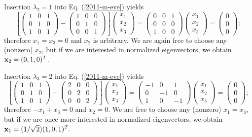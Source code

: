{Insertion  $\lambda_2=1$ into Eq. (\ref{2011-m-eve}) yields
\begin{equation}
\left[
\begin{pmatrix}
1&0&1\\
0&1&0\\
1&0&1
\end{pmatrix}  -
\begin{pmatrix}
1&0&0\\
0&1&0\\
0&0&1
\end{pmatrix}
\right]
\begin{pmatrix}
x_1\\
x_2\\
x_3
\end{pmatrix}
=
\begin{pmatrix}
0&0&1\\
0&0&0\\
1&0&0
\end{pmatrix}
\begin{pmatrix}
x_1\\
x_2\\
x_3
\end{pmatrix}
=
\begin{pmatrix}
0\\
0\\
0
\end{pmatrix}
;
\end{equation}
therefore $x_1=x_3=0$ and $x_2$ is arbitrary.
We are again free to choose any (nonzero) $x_2$,
but if we are interested in normalized eigenvectors, we obtain
${\bf x}_2 = (0,1,0)^T$.


Insertion  $\lambda_3=2$ into Eq. (\ref{2011-m-eve}) yields
\begin{equation}
\left[
\begin{pmatrix}
1&0&1\\
0&1&0\\
1&0&1
\end{pmatrix}  -
\begin{pmatrix}
2&0&0\\
0&2&0\\
0&0&2
\end{pmatrix}
\right]
\begin{pmatrix}
x_1\\
x_2\\
x_3
\end{pmatrix}
=
\begin{pmatrix}
-1&0&1\\
0&-1&0\\
1&0&-1
\end{pmatrix}
\begin{pmatrix}
x_1\\
x_2\\
x_3
\end{pmatrix}
=
\begin{pmatrix}
0\\
0\\
0
\end{pmatrix}
;
\end{equation}
therefore $-x_1+x_3=0$ and $x_2=0$.
We are free to choose any (nonzero) $x_1=x_3$,
but if we are once more interested in normalized eigenvectors, we obtain
${\bf x}_1 =(1/\sqrt{2})(1,0,1)^T$.

}
